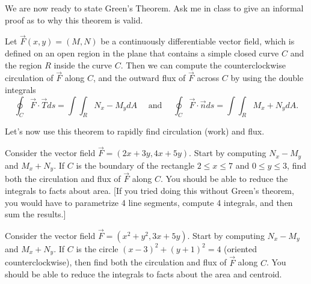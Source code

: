 We are now ready to state Green's Theorem.  Ask me in class to give an informal proof as to why this theorem is valid.
\begin{theorem}
 Let $\vec F(x,y)=(M,N)$ be a continuously differentiable vector field, which is defined on an open region in the plane that contains a simple closed curve $C$ and the region $R$ inside the curve $C$.  Then we can compute the counterclockwise circulation of $\vec F$ along $C$, and the outward flux of $\vec F$ across $C$ by using the double integrals
$$ \oint_{C} \vec F \cdot \vec T ds=\int\int_R N_x-M_y dA 
\quad \text{ and } \quad 
\oint_{C} \vec F \cdot \vec n ds=\int\int_R M_x+N_y dA.$$
\end{theorem}

Let's now use this theorem to rapidly find circulation (work) and flux.


\begin{problem}
 Consider the vector field $\vec F=(2x+3y,4x+5y)$. Start by computing $N_x-M_y$ and $M_x+N_y$. 
 If $C$ is the boundary of the rectangle $2\leq x\leq 7$ and $0\leq y\leq 3$, find both the circulation and flux of $\vec F$ along $C$. You should be able to reduce the integrals to facts about area. [If you tried doing this without Green's theorem, you would have to parametrize 4 line segments, compute 4 integrals, and then sum the results.]
\end{problem}

\begin{problem}
 Consider the vector field $\vec F=(x^2+y^2,3x+5y)$. Start by computing $N_x-M_y$ and $M_x+N_y$. 
 If $C$ is the circle $(x-3)^2+(y+1)^2=4$ (oriented counterclockwise), then find both the circulation and flux of $\vec F$ along $C$. You should be able to reduce the integrals to facts about the area and centroid.
\end{problem}

